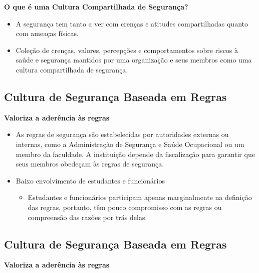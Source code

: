 \documentclass[
  letterpaper,
  DIV=11,
  numbers=noendperiod]{scrartcl}
\providecommand{\tightlist}{%
  \setlength{\itemsep}{0pt}\setlength{\parskip}{0pt}}\usepackage{longtable,booktabs,array}
\begin{document}
\textbf{O que é uma Cultura Compartilhada de Segurança?}

\begin{itemize}
\item
  A segurança tem tanto a ver com crenças e atitudes compartilhadas
  quanto com ameaças físicas.
\item
  Coleção de crenças, valores, percepções e comportamentos sobre riscos
  à saúde e segurança mantidos por uma organização e seus membros como
  uma cultura compartilhada de segurança.
\end{itemize}

\subsection{Cultura de Segurança Baseada em
Regras}\label{cultura-de-seguranuxe7a-baseada-em-regras}

\textbf{Valoriza a aderência às regras}

\begin{itemize}
\item
  As regras de segurança são estabelecidas por autoridades externas ou
  internas, como a Administração de Segurança e Saúde Ocupacional ou um
  membro da faculdade. A instituição depende da fiscalização para
  garantir que seus membros obedeçam às regras de segurança.
\item
  Baixo envolvimento de estudantes e funcionários

  \begin{itemize}
  \tightlist
  \item
    Estudantes e funcionários participam apenas marginalmente na
    definição das regras, portanto, têm pouco compromisso com as regras
    ou compreensão das razões por trás delas.
  \end{itemize}
\end{itemize}

\subsection{Cultura de Segurança Baseada em
Regras}\label{cultura-de-seguranuxe7a-baseada-em-regras-1}

\textbf{Valoriza a aderência às regras}
\end{document}

